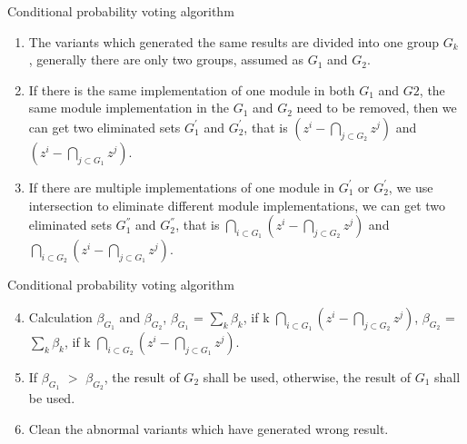 \documentclass{beamer}
\begin{document}
\begin{frame}{Conditional probability voting algorithm}
    \begin{block}{}
        \begin{enumerate}
            \item  The variants which generated the same results are divided into one group $G_k$ , generally there are only two groups, assumed as $G_1$ and $G_2$.
            \item If there is the same implementation of one module in both $G_1$ and $G2$, the same module implementation in the $G_1$ and $G_2$ need to be removed, then we can get two eliminated sets $G_1^'$ and $G_2^'$, that is $(z^i-\bigcap\limits_{j \subset G_2}^{}z^j)$ and $(z^i-\bigcap\limits_{j \subset G_1}^{}z^j)$.
            \item If there are multiple implementations of one module in $G_1^'$ or $G_2^'$, we use intersection to eliminate different module implementations, we can get two eliminated sets $G_1^''$ and $G_2^''$, that is $ \bigcap\limits_{i \subset G_1}^{}(z^i-\bigcap\limits_{j \subset G_2}^{}z^j)$ and $\bigcap\limits_{i \subset G_2}^{}(z^i-\bigcap\limits_{j \subset G_1}^{}z^j)$.
        \end{enumerate}
    \end{block}
\end{frame}
\begin{frame}{Conditional probability voting algorithm}
    \begin{block}{}
        \begin{enumerate}
            \setcounter{enumi}{3}
            \item Calculation $\beta_{G_1}$ and $\beta_{G_2}$,
            $\beta_{G_1}$ = $\sum_{k}^{} \beta_k$, if k \in $ \bigcap\limits_{i \subset G_1}^{}(z^i-\bigcap\limits_{j \subset G_2}^{}z^j)$, $\beta_{G_2}$ = $\sum_{k}^{} \beta_k$, if k \in $\bigcap\limits_{i \subset G_2}^{}(z^i-\bigcap\limits_{j \subset G_1}^{}z^j)$.
            \item If $\beta_{G_1}$ $>$ $\beta_{G_2}$, the result of $G_2$ shall be used, otherwise, the result of $G_1$ shall be used.
            \item Clean the abnormal variants which have generated wrong result.
        \end{enumerate}
    \end{block}
\end{frame}
\end{document}
